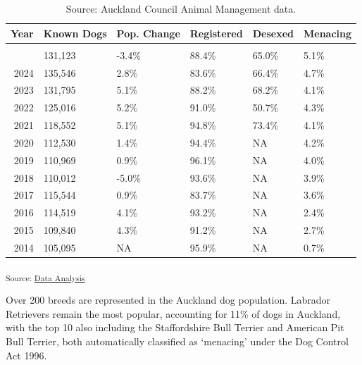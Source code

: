 \documentclass[
  letterpaper,
  DIV=11,
  numbers=noendperiod]{scrartcl}
\begin{document}
{

\begin{longtable}[]{@{}rlllll@{}}

\toprule\noalign{}
Year & Known Dogs & Pop. Change & Registered & Desexed & Menacing \\
\midrule\noalign{}
\endhead
\bottomrule\noalign{}

\caption{\label{tbl-ownership}Source: Auckland Council Animal Management
data.}

\tabularnewline

\endlastfoot
2025 & 131,123 & -3.4\% & 88.4\% & 65.0\% & 5.1\% \\
2024 & 135,546 & 2.8\% & 83.6\% & 66.4\% & 4.7\% \\
2023 & 131,795 & 5.1\% & 88.2\% & 68.2\% & 4.1\% \\
2022 & 125,016 & 5.2\% & 91.0\% & 50.7\% & 4.3\% \\
2021 & 118,552 & 5.1\% & 94.8\% & 73.4\% & 4.1\% \\
2020 & 112,530 & 1.4\% & 94.4\% & NA & 4.2\% \\
2019 & 110,969 & 0.9\% & 96.1\% & NA & 4.0\% \\
2018 & 110,012 & -5.0\% & 93.6\% & NA & 3.9\% \\
2017 & 115,544 & 0.9\% & 83.7\% & NA & 3.6\% \\
2016 & 114,519 & 4.1\% & 93.2\% & NA & 2.4\% \\
2015 & 109,840 & 4.3\% & 91.2\% & NA & 2.7\% \\
2014 & 105,095 & NA & 95.9\% & NA & 0.7\% \\

\end{longtable}

}

\textsubscript{Source:
\href{https://tesaunders.github.io/dog-control/notebooks/data-analysis-preview.html\#cell-tbl-ownership}{Data
Analysis}}

Over 200 breeds are represented in the Auckland dog population. Labrador
Retrievers remain the most popular, accounting for 11\% of dogs in
Auckland, with the top 10 also including the Staffordshire Bull Terrier
and American Pit Bull Terrier, both automatically classified as
`menacing' under the Dog Control Act 1996.
\end{document}
